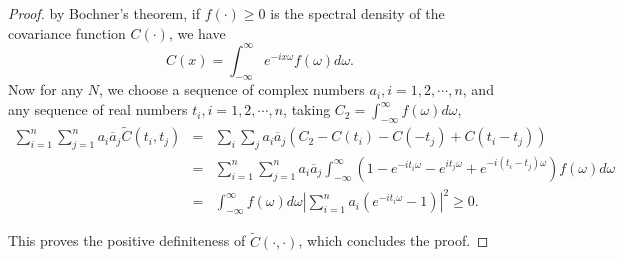 \begin{proof} by Bochner's theorem, if $f(\cdot) \ge 0$ is the spectral density of the covariance function $C(\cdot)$, we have
				\[
					C(x) = \int_{-\infty}^\infty e^{-ix\omega}f(\omega)d\omega.
				\]
Now for any $N$, we choose a sequence of complex numbers $a_i, i = 1, 2, \cdots, n$, and any sequence of real numbers $t_i, i = 1, 2, \cdots, n$, taking $C_2 = \int_{-\infty}^\infty f(\omega)d\omega$,
\begin{eqnarray*}
					\sum_{i=1}^n \sum_{j=1}^n a_i \overline{a}_j \tilde{C}(t_i, t_j) &=& \sum_i \sum_j a_i \overline{a}_j (C_2 - C(t_i) - C(-t_j) + C(t_i-t_j)) \\
					&=& \sum_{i=1}^n \sum_{j=1}^n a_i \overline{a}_j \int_{-\infty}^\infty(1-  e^{-it_i\omega} - e^{it_j\omega} + e^{-i(t_i-t_j)\omega})f(\omega)d\omega \\
					&=&\int_{-\infty}^\infty f(\omega)d\omega \left|\sum_{i=1}^n a_i(e^{-it_i\omega} - 1)\right|^2 \ge 0.
\end{eqnarray*}

This proves the positive definiteness of $\tilde{C}(\cdot, \cdot)$, which concludes the proof.

\end{proof}

